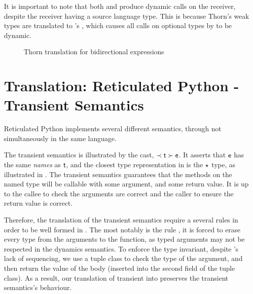 \documentclass[a4paper,USenglish]{tex/lipics-v2016}
\begin{document}
It is important to note that both  and  produce
dynamic calls on the receiver, despite the  receiver having a source language
type. This is because Thorn's weak types are translated to \kafka's \any, which
causes  all calls on optional types by \kafka to be dynamic.

\begin{figure}
\begin{mathpar}




\end{mathpar}
\caption{Thorn translation for bidirectional expressions}
\label{fig:thorntrans_exp2}
\end{figure}

\section{Translation: Reticulated Python - Transient Semantics}

Reticulated Python implements several different semantics, through not
simultaneously in the same language.

The transient semantics is illustrated by the cast, $\ShaCast\t\e$. It asserts
that $\e$ has the same \emph{names} as $\t$, and the closest type representation
in \kafka is the $\any$ type, as illustrated in . The transient
semantics  guarantees that the methods on the named type will be callable with
some argument, and some return value. It is up to  the callee to check the
arguments are correct and the caller to ensure the return value is correct.

Therefore, the translation of the transient semantics require a several rules in
order to be well formed in \kafka.  The most notably is the rule
, it is forced to erase every type from the arguments to the
function,  as typed arguments may not be respected in the dynamics semantics. To
enforce the type invariant, despite \kafka's lack of sequencing, we use a tuple
class to check the type of the argument, and then return  the value of the body
(inserted into the second field of the tuple class). As a result, our translation
of transient into \kafka preserves the transient semantics's behaviour.
\end{document}
